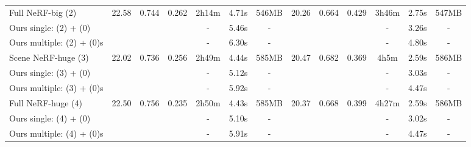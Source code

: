 \begin{table*}[ht!]
{\begin{tabular}{l|*{6}{c}|*{6}{c}}
        \hline
        Full NeRF-big (2)       & 22.58 & 0.744 & 0.262 & 2h14m & 4.71s & 546MB        
                                                                                & 20.26 & 0.664 & 0.429 & 3h46m & 2.75s & 547MB \\
        Ours single: (2) + (0)                 & \cellcolor{yellow!50}{22.65} & \cellcolor{yellow!50}{0.747} & \cellcolor{yellow!50}{0.256} & - & 5.46s & -      
                                                                                & \cellcolor{yellow!50}{20.36} & \cellcolor{yellow!50}{0.665} & \cellcolor{yellow!50}{0.421} & - & 3.26s & - \\
        Ours multiple: (2) + (0)s       & \cellcolor{orange!50}{22.80} & \cellcolor{orange!50}{0.752} & \cellcolor{orange!50}{0.251} & - & 6.30s & -         
                                                                                & \cellcolor{orange!50}{20.53} & \cellcolor{orange!50}{0.668} & \cellcolor{orange!50}{0.406} & - & 4.80s & - \\
        \hline
        \hline
        Scene NeRF-huge (3)     & 22.02 & 0.736 & 0.256 & 2h49m & 4.44s & 585MB        
                                                                                & 20.47 & 0.682 & 0.369 & 4h5m & 2.59s & 586MB \\
        Ours single: (3) + (0)                & \cellcolor{yellow!50}{22.17} & \cellcolor{yellow!50}{0.742} & \cellcolor{yellow!50}{0.251} & - & 5.12s & -      
                                                                                & \cellcolor{yellow!50}{20.54} & \cellcolor{yellow!50}{0.683} & \cellcolor{yellow!50}{0.367} & - & 3.03s & - \\
        Ours multiple: (3) + (0)s       & \cellcolor{orange!50}{22.32} & \cellcolor{orange!50}{0.747} & \cellcolor{orange!50}{0.246} & - & 5.92s & -         
                                                                                & \cellcolor{orange!50}{20.68} & \cellcolor{orange!50}{0.686} & \cellcolor{orange!50}{0.366} & - & 4.47s & - \\
        \hline
        Full NeRF-huge (4)      & 22.50 & 0.756 & 0.235 & 2h50m & 4.43s & 585MB         
                                                                                & 20.37 & 0.668 & 0.399 & 4h27m & 2.59s & 586MB \\
        Ours single: (4) + (0)                 & \cellcolor{yellow!50}{22.57} & \cellcolor{yellow!50}{0.757} & \cellcolor{yellow!50}{0.234} & - & 5.10s & -      
                                                                                & \cellcolor{yellow!50}{20.46} & \cellcolor{yellow!50}{0.669} & \cellcolor{yellow!50}{0.395} & - & 3.02s & - \\
        Ours multiple: (4) + (0)s       & \cellcolor{orange!50}{22.71} & \cellcolor{orange!50}{0.761} & \cellcolor{orange!50}{0.232} & - & 5.91s & -         
                                                                                & \cellcolor{orange!50}{20.64} & \cellcolor{orange!50}{0.671} & \cellcolor{orange!50}{0.389} & - & 4.47s & - \\


\end{tabular}}
\end{table*}
